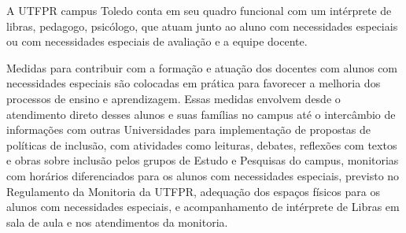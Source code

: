 A UTFPR campus Toledo conta em seu quadro funcional com um intérprete de libras, pedagogo, psicólogo, que atuam junto ao aluno com necessidades especiais ou com necessidades especiais de avaliação e a equipe docente.

Medidas para contribuir com a formação e atuação dos docentes com alunos com necessidades especiais são colocadas em prática para favorecer a melhoria dos processos de ensino e aprendizagem. Essas medidas envolvem desde o atendimento direto desses alunos e suas famílias no campus até o intercâmbio de informações com outras Universidades para implementação de propostas de políticas de inclusão, com atividades como leituras, debates, reflexões com textos e obras sobre inclusão pelos grupos de Estudo e Pesquisas do campus, monitorias com horários diferenciados para os alunos com necessidades especiais, previsto no Regulamento da Monitoria da UTFPR, adequação dos espaços físicos para os alunos com necessidades especiais, e acompanhamento de intérprete de Libras em sala de aula e nos atendimentos da monitoria.

  